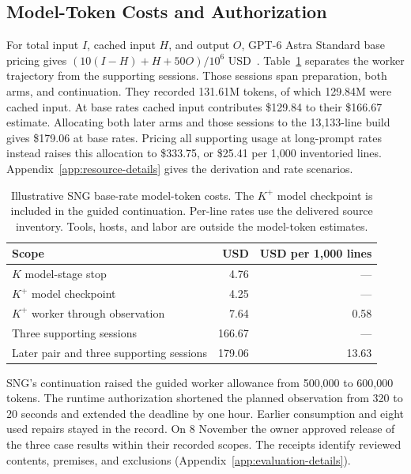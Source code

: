 \subsection{Model-Token Costs and Authorization}
For total input $I$, cached input $H$, and output $O$, GPT-6 Astra Standard base pricing gives $(10(I-H)+H+50O)/10^6$ USD~\cite{openaiAstraPricing2026}. Table~\ref{tab:cost-summary} separates the worker trajectory from the supporting sessions. Those sessions span preparation, both arms, and continuation. They recorded 131.61M tokens, of which 129.84M were cached input. At base rates cached input contributes \$129.84 to their \$166.67 estimate. Allocating both later arms and those sessions to the 13,133-line build gives \$179.06 at base rates. Pricing all supporting usage at long-prompt rates instead raises this allocation to \$333.75, or \$25.41 per 1,000 inventoried lines. Appendix~\ref{app:resource-details} gives the derivation and rate scenarios.

\begin{table}[!htbp]
\caption{Illustrative SNG base-rate model-token costs. The $K^{+}$ model checkpoint is included in the guided continuation. Per-line rates use the delivered source inventory. Tools, hosts, and labor are outside the model-token estimates.}
\label{tab:cost-summary}
\centering\small
\begin{tabular}{@{}p{.55\linewidth}rr@{}}
\toprule
Scope & USD & USD per 1,000 lines \\
\midrule
$K$ model-stage stop & 4.76 & --- \\
$K^{+}$ model checkpoint & 4.25 & --- \\
$K^{+}$ worker through observation & 7.64 & 0.58 \\
Three supporting sessions & 166.67 & --- \\
Later pair and three supporting sessions & 179.06 & 13.63 \\
\bottomrule
\end{tabular}
\end{table}

SNG's continuation raised the guided worker allowance from 500,000 to 600,000 tokens. The runtime authorization shortened the planned observation from 320 to 20 seconds and extended the deadline by one hour. Earlier consumption and eight used repairs stayed in the record. On 8 November the owner approved release of the three case results within their recorded scopes. The receipts identify reviewed contents, premises, and exclusions (Appendix~\ref{app:evaluation-details}).

